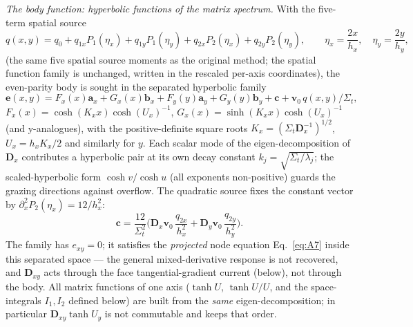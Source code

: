 \documentclass[11pt,a4paper]{article}
\begin{document}
\emph{The body function: hyperbolic functions of the matrix spectrum.}
With the five-term spatial source
\begin{equation}
q(x,y) = q_0+q_{1x}P_1(\eta_x)+q_{1y}P_1(\eta_y)+q_{2x}P_2(\eta_x)
+q_{2y}P_2(\eta_y),\qquad
\eta_x=\frac{2x}{h_x},\quad \eta_y=\frac{2y}{h_y},
\label{eq:source5}
\end{equation}
(the same five spatial source moments as the original method; the
spatial function family is unchanged, written in the rescaled
per-axis coordinates), the even-parity body is sought in the separated
hyperbolic family
\begin{equation}
\mathbf{e}(x,y) = F_x(x)\mathbf{a}_x+G_x(x)\mathbf{b}_x
+F_y(y)\mathbf{a}_y+G_y(y)\mathbf{b}_y+\mathbf{c}
+\mathbf{v}_0\,q(x,y)/\Sigma_t,
\label{eq:A10}
\end{equation}
$F_x(x)=\cosh(K_x x)\cosh(U_x)^{-1}$,
$G_x(x)=\sinh(K_x x)\cosh(U_x)^{-1}$ (and y-analogues), with the
positive-definite square roots $K_x=(\Sigma_t\mathbf{D}_x^{-1})^{1/2}$,
$U_x=h_xK_x/2$ and similarly for $y$. Each scalar mode of the
eigen-decomposition of $\mathbf{D}_x$ contributes a hyperbolic pair at
its own decay constant $k_j=\sqrt{\Sigma_t/\lambda_j}$; the
scaled-hyperbolic form $\cosh v/\cosh u$ (all exponents non-positive)
guards the grazing directions against overflow. The quadratic source
fixes the constant vector by $\partial_x^2 P_2(\eta_x)=12/h_x^2$:
\begin{equation}
\mathbf{c} = \frac{12}{\Sigma_t^2}\Big(
\mathbf{D}_x\mathbf{v}_0\,\frac{q_{2x}}{h_x^2}
+\mathbf{D}_y\mathbf{v}_0\,\frac{q_{2y}}{h_y^2}\Big).
\label{eq:A11}
\end{equation}
The family has $e_{xy}=0$; it satisfies the \emph{projected} node
equation Eq.~\eqref{eq:A7} inside this separated space --- the general
mixed-derivative response is not recovered, and
$\mathbf{D}_{xy}$ acts through the face tangential-gradient current
(below), not through the body. All matrix functions of one axis
($\tanh U$, $\tanh U/U$, and the space-integrals $I_1,I_2$ defined below)
are built from the \emph{same} eigen-decomposition; in particular
$\mathbf{D}_{xy}\tanh U_y$ is not commutable and keeps that order.
\end{document}
